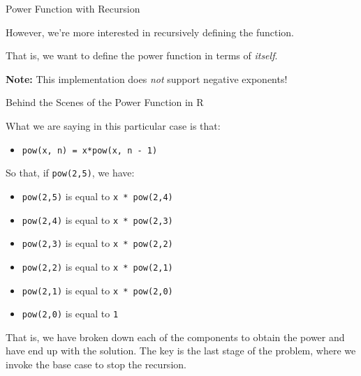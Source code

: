 \begin{frame}[fragile]{Power Function with Recursion}

However, we're more interested in recursively defining the function.

That is, we want to define the power function in terms of \emph{itself}.

\begin{Shaded}
\begin{Highlighting}[]
\StringTok{ }
  
    \StringTok{ }\NormalTok{)\{      }
      \NormalTok{(}\NormalTok{)       }
    \NormalTok{\} }
    
    \StringTok{ }\StringTok{ }\NormalTok{)) }
\NormalTok{\}}
\end{Highlighting}
\end{Shaded}

\textbf{Note:} This implementation does \emph{not} support negative
exponents!

\end{frame}

\begin{frame}[fragile]{Behind the Scenes of the Power Function in R}

What we are saying in this particular case is that:

\begin{itemize}
\tightlist
\item
  \texttt{pow(x,\ n)\ =\ x*pow(x,\ n\ -\ 1)}
\end{itemize}

So that, if \texttt{pow(2,5)}, we have:

\begin{itemize}
\tightlist
\item
  \texttt{pow(2,5)} is equal to \texttt{x\ *\ pow(2,4)}
\item
  \texttt{pow(2,4)} is equal to \texttt{x\ *\ pow(2,3)}
\item
  \texttt{pow(2,3)} is equal to \texttt{x\ *\ pow(2,2)}
\item
  \texttt{pow(2,2)} is equal to \texttt{x\ *\ pow(2,1)}
\item
  \texttt{pow(2,1)} is equal to \texttt{x\ *\ pow(2,0)}
\item
  \texttt{pow(2,0)} is equal to \texttt{1}
\end{itemize}

That is, we have broken down each of the components to obtain the power
and have end up with the solution. The key is the last stage of the
problem, where we invoke the base case to stop the recursion.

\end{frame}

